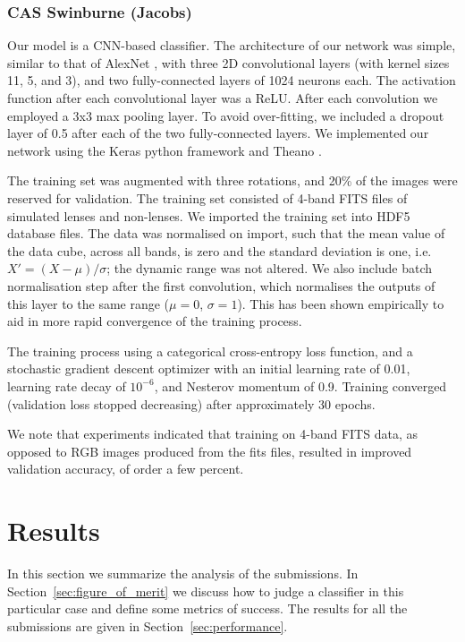 \documentclass{aa}
\begin{document}
\subsubsection{CAS Swinburne (Jacobs)}
\label{sec:CASSwinburne}

Our model is a CNN-based classifier. The architecture of our network was simple, similar to that of AlexNet \citep{krizhevsky_imagenet_2012}, with three 2D convolutional layers (with kernel sizes 11, 5, and 3), and two fully-connected layers of 1024 neurons each. The activation function after each convolutional layer was a ReLU. After each convolution we employed a 3x3 max pooling layer. To avoid over-fitting, we included a dropout layer of 0.5 after each of the two fully-connected layers. We implemented our network using the Keras python framework \citep{Chollet_2015} and Theano \citep{Bastien_2012}.

The training set was augmented with three rotations, and 20\% of the images were reserved for validation. The training set consisted of 4-band FITS files of simulated lenses and non-lenses. We imported the training set into HDF5 database files. The data was normalised on import, such that the mean value of the data cube, across all bands, is zero and the standard deviation is one, i.e. \(X' = (X - \mu)/\sigma\); the dynamic range was not altered. We also include batch normalisation step after the first convolution, which normalises the outputs of this layer to the same range (\(\mu = 0\), \(\sigma = 1\)). This has been shown empirically to aid in more rapid convergence of the training process.

The training process using a categorical cross-entropy loss function, and a stochastic gradient descent optimizer with an initial learning rate of 0.01, learning rate decay of \(10^{-6}\), and Nesterov momentum \citep{nesterov83method} of 0.9. Training converged (validation loss stopped decreasing) after approximately 30 epochs.

We note that experiments indicated that training on 4-band FITS data, as opposed to RGB images produced from the fits files, resulted in improved validation accuracy, of order a few percent. 

\section{Results}
\label{sec:results}

In this section we summarize the analysis of the submissions.  In Section~\ref{sec:figure_of_merit} we discuss how to judge a classifier in this particular case and define some metrics of success.  The results for all the submissions are given in Section~\ref{sec:performance}.
\end{document}
